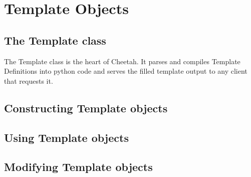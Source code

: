 \section{Template Objects}
\label{TSobjects}

\subsection{The Template class}
The Template class is the heart of Cheetah.  It parses and compiles
Template Definitions into python code and serves the filled template output to
any client that requests it.  

\subsection{Constructing Template objects}


\subsection{Using Template objects}


\subsection{Modifying Template objects}



